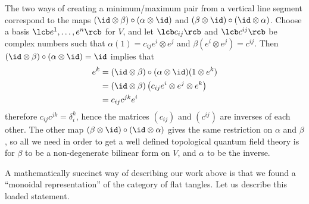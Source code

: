 The two ways of creating a minimum/maximum pair from a vertical line segment correspond to the maps $(\id \otimes \beta) \circ (\alpha \otimes \id)$ and $(\beta \otimes \id) \circ (\id \otimes \alpha)$. Choose a basis $\lcb e^1,\ldots,e^n \rcb$ for $V$, and let $\lcb c_{ij} \rcb$ and $\lcb c^{ij} \rcb$ be complex numbers such that $\alpha(1) = c_{ij} e^i \otimes e^j$ and $\beta(e^i\otimes e^j)=c^{ij}$. Then $(\id \otimes \beta) \circ (\alpha \otimes \id) = \id$ implies that
\begin{align*}
	e^k &= (\id \otimes \beta) \circ (\alpha \otimes \id)(1 \otimes e^k) \\
	    &= (\id \otimes \beta) \left( c_{ij} e^i \otimes e^j \otimes e^k \right) \\
	    &= c_{ij} c^{jk} e^i
\end{align*}
therefore $c_{ij} c^{jk} = \delta_i^k$, hence the matrices $(c_{ij})$ and $(c^{ij})$ are inverses of each other. The other map $(\beta \otimes \id) \circ (\id \otimes \alpha)$ gives the same restriction on $\alpha$ and $\beta$, so all we need in order to get a well defined topological quantum field theory is for $\beta$ to be a non-degenerate bilinear form on $V$, and $\alpha$ to be the inverse.
 
A mathematically succinct way of describing our work above is that we found a ``monoidal representation'' of the category of flat tangles. Let us describe this loaded statement. 






